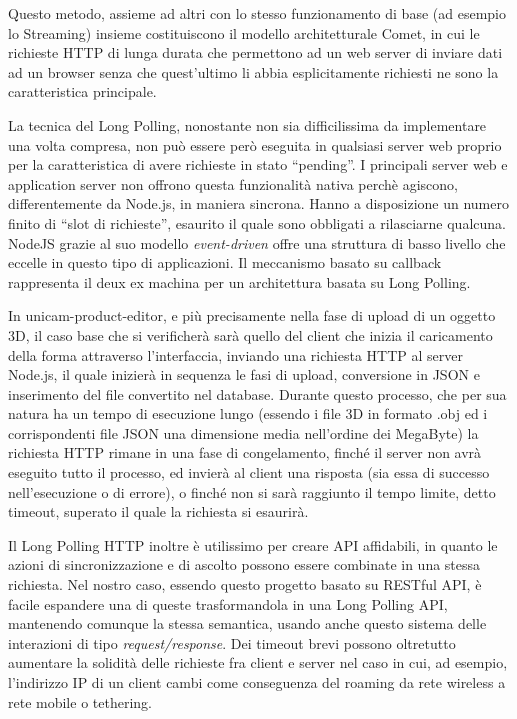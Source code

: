 Questo metodo, assieme ad altri con lo stesso funzionamento di base (ad esempio lo Streaming) insieme costituiscono il modello architetturale Comet, in cui le richieste HTTP di lunga durata che permettono ad un web server di inviare dati ad un browser senza che quest'ultimo li abbia esplicitamente richiesti ne sono la caratteristica principale.

La tecnica del Long Polling, nonostante non sia difficilissima da implementare una volta compresa, non può essere però eseguita in qualsiasi server web proprio per la caratteristica di avere richieste in stato “pending”. I principali server web e application server non offrono questa funzionalità nativa perchè agiscono, differentemente da Node.js, in maniera sincrona. Hanno a disposizione un numero finito di “slot di richieste”, esaurito il quale sono obbligati a rilasciarne qualcuna.
NodeJS grazie al suo modello \emph{event-driven} offre una struttura di basso livello che eccelle in questo tipo di applicazioni. Il meccanismo basato su callback rappresenta il deux ex machina per un architettura basata su Long Polling.

In unicam-product-editor, e più precisamente nella fase di upload di un oggetto 3D, il caso base che si verificherà sarà quello del client che inizia il caricamento della forma attraverso l'interfaccia, inviando una richiesta HTTP al server Node.js, il quale inizierà in sequenza le fasi di upload, conversione in JSON e inserimento del file convertito nel database. Durante questo processo, che per sua natura ha un tempo di esecuzione lungo (essendo i file 3D in formato .obj ed i corrispondenti file JSON una dimensione media nell'ordine dei MegaByte) la richiesta HTTP rimane in una fase di congelamento, finché il server non avrà eseguito tutto il processo, ed invierà al client una risposta (sia essa di successo nell'esecuzione o di errore), o finché non si sarà raggiunto il tempo limite, detto timeout, superato il quale la richiesta si esaurirà.

Il Long Polling HTTP inoltre è utilissimo per creare API affidabili, in quanto le azioni di sincronizzazione e di ascolto possono essere combinate in una stessa richiesta. Nel nostro caso, essendo questo progetto basato su RESTful API, è facile espandere una di queste trasformandola in una Long Polling API, mantenendo comunque la stessa semantica, usando anche questo sistema delle interazioni di tipo \emph{request/response}. Dei timeout brevi possono oltretutto aumentare la solidità delle richieste fra client e server nel caso in cui, ad esempio, l'indirizzo IP di un client cambi come conseguenza del roaming da rete wireless a rete mobile o tethering.

